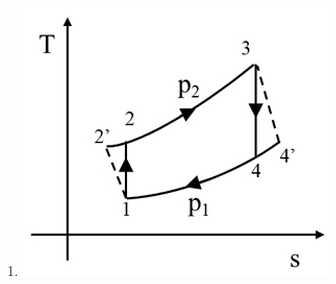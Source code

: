 \documentclass[journal]{IEEEtran}
\theoremstyle{remark}
\begin{document}
\begin{enumerate}[itemsep=1em]
\begin{multicols}{4}
\begin{enumerate}
    \item \begin{minipage}[t]{0.2\textwidth}
    \vspace{0pt}
        \includegraphics[width=\columnwidth]{figs/fig-18.jpeg}
    \label{fig:18}
    \end{minipage}
\end{enumerate}
\end{multicols}
\end{enumerate}
\end{document}

